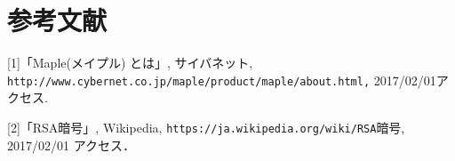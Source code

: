 \section{参考文献}
[1]「Maple(メイプル) とは」, サイバネット, \verb|http://www.cybernet.co.jp/maple/product/maple/about.html,| 2017/02/01アクセス.

[2]「RSA暗号」, Wikipedia, \verb|https://ja.wikipedia.org/wiki/RSA|暗号, 2017/02/01 アクセス．

